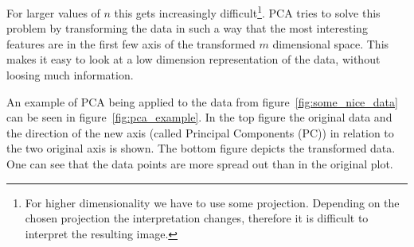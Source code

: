 \documentclass[a4paper]{IEEEtran}
\begin{document}
For larger values of $n$ this gets increasingly difficult\footnote{For higher dimensionality we have to use some projection. Depending on the chosen projection the interpretation changes, therefore it is difficult to interpret the resulting image.}. PCA tries to solve this problem by transforming the data in such a way that the most interesting features are in the first few axis of the transformed $m$ dimensional space. This makes it easy to look at a low dimension representation of the data, without loosing much information.

An example of PCA being applied to the data from figure~\ref{fig:some_nice_data} can be seen in figure~\ref{fig:pca_example}. In the top figure the original data and the direction of the new axis (called Principal Components (PC)) in relation to the two original axis is shown. The bottom figure depicts the transformed data. One can see that the data points are more spread out than in the original plot.
\end{document}
